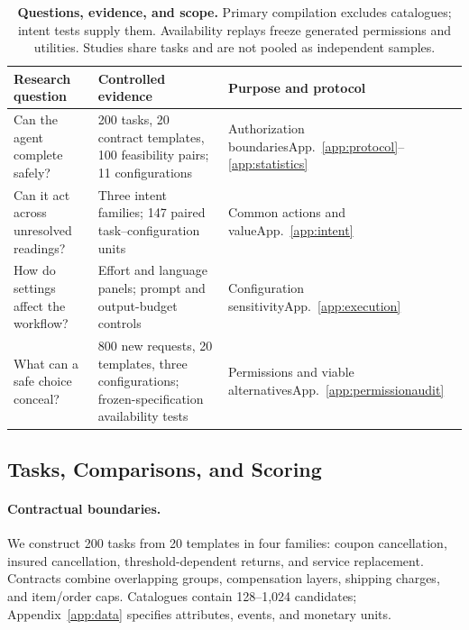 \documentclass[11pt]{article}
\begin{document}
\begin{table}[t]
\centering\small
\setlength{\tabcolsep}{4pt}
\begin{tabular}{@{}p{}p{}p{}@{}}
\toprule
Research question & Controlled evidence & Purpose and protocol\\
\midrule
Can the agent complete safely? & 200 tasks, 20 contract templates, 100 feasibility pairs; 11 configurations & Authorization boundaries\newline App.~\mbox{\ref{app:protocol}--\ref{app:statistics}}\\
Can it act across unresolved readings? & Three intent families; 147 paired task--configuration units & Common actions and value\newline App.~\ref{app:intent}\\
How do settings affect the workflow? & Effort and language panels; prompt and output-budget controls & Configuration sensitivity\newline App.~\ref{app:execution}\\
What can a safe choice conceal? & 800 new requests, 20 templates, three configurations; frozen-specification availability tests & Permissions and viable alternatives\newline App.~\ref{app:permissionaudit}\\
\bottomrule
\end{tabular}
\caption{\textbf{Questions, evidence, and scope.} Primary compilation excludes catalogues; intent tests supply them. Availability replays freeze generated permissions and utilities. Studies share tasks and are not pooled as independent samples.}
\label{tab:evaluation-coverage}
\end{table}

\subsection{Tasks, Comparisons, and Scoring}
\label{sec:setup}
\paragraph{Contractual boundaries.}
We construct 200 tasks from 20 templates in four families: coupon cancellation, insured cancellation, threshold-dependent returns, and service replacement. Contracts combine overlapping groups, compensation layers, shipping charges, and item/order caps. Catalogues contain 128--1,024 candidates; Appendix~\ref{app:data} specifies attributes, events, and monetary units.
\end{document}
